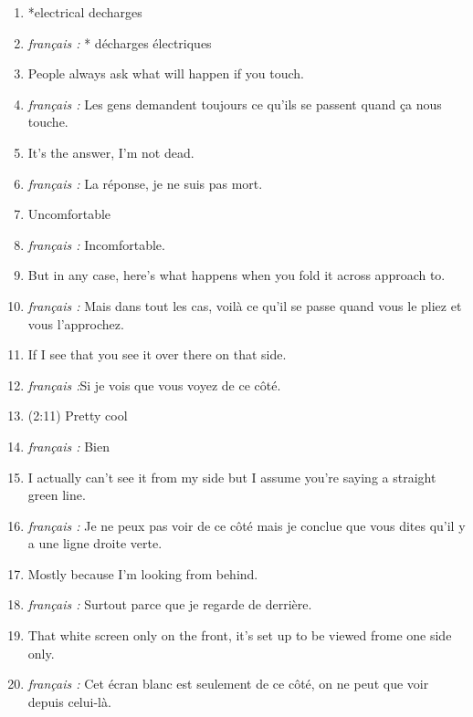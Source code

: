 \documentclass[../main.tex]{subfiles}
\begin{document}
\begin{enumerate}
    \item *electrical decharges
     \item \hspace*{1cm} \emph{ français :} * décharges électriques
    \item People always ask what will happen if you touch.
     \item \hspace*{1cm} \emph{ français :} Les gens demandent toujours ce qu'ils se passent quand ça nous touche.
    \item It's the answer, I'm not dead.
     \item \hspace*{1cm} \emph{ français :} La réponse, je ne suis pas mort.
    \item Uncomfortable
     \item \hspace*{1cm} \emph{ français :} Incomfortable.
    \item But in any case, here's what happens when you fold it across approach to.
     \item \hspace*{1cm} \emph{ français :} Mais dans tout les cas, voilà ce qu'il se passe quand vous le pliez et vous l'approchez.
    \item If I see that you see it over there on that side.
     \item \hspace*{1cm} \emph{ français :}Si je vois que vous voyez de ce côté.
    \item (2:11) Pretty cool
    \item \hspace*{1cm} \emph{ français :} Bien
    \item I actually can't see it from my side but I assume you're saying a straight green line.
     \item \hspace*{1cm} \emph{ français :} Je ne peux pas voir de ce côté mais je conclue que vous dites qu'il y a une ligne droite verte.
    \item Mostly because I'm looking from behind.
     \item \hspace*{1cm} \emph{ français :} Surtout parce que je regarde de derrière.
    \item That white screen only on the front, it's set up to be viewed frome one side only.
     \item \hspace*{1cm} \emph{ français :} Cet écran blanc est seulement de ce côté, on ne peut que voir depuis celui-là.

\end{enumerate}
\end{document}
